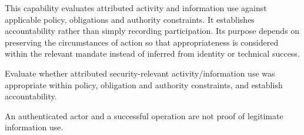 This capability evaluates attributed activity and information use against applicable policy, obligations and authority constraints. It establishes accountability rather than simply recording participation. Its purpose depends on preserving the circumstances of action so that appropriateness is considered within the relevant mandate instead of inferred from identity or technical success.



Evaluate whether attributed security-relevant activity/\allowbreak{}information use was appropriate within policy, obligation and authority constraints, and establish accountability.



An authenticated actor and a successful operation are not proof of legitimate information use.


